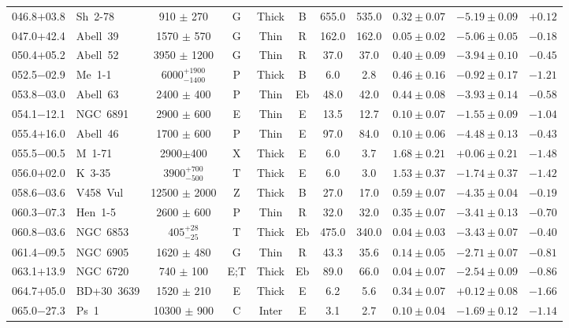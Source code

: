 \documentclass[useAMS]{mn2e}
\begin{document}
\begin{center}
{\begin{longtable}{llccccccccc}
046.8$+$03.8		&	Sh~2-78	&	910	$\pm$	270	&	G		&	Thick		&	B		&	655.0		&	535.0		&	$0.32 \pm 0.07$		&	$-5.19 \pm 0.09$		&	$+0.12$	\\
047.0$+$42.4		&	Abell~39	&	1570	$\pm$	570	&	G		&	Thin		&	R		&	162.0		&	162.0		&	$0.05 \pm 0.02$		&	$-5.06 \pm 0.05$		&	$-0.18$	\\
050.4$+$05.2		&	Abell~52	&	3950	$\pm$	1200	&	G		&	Thin		&	R		&	37.0		&	37.0		&	$0.40 \pm 0.09$		&	$-3.94 \pm 0.10$		&	$-0.45$	\\
052.5$-$02.9		&	Me~1-1	&	$6000^{+1900}_{-1400}$		&	P		&	Thick		&	B		&	6.0		&	2.8		&	$0.46 \pm 0.16$		&	$-0.92 \pm 0.17$		&	$-1.21$	\\
053.8$-$03.0		&	Abell~63	&	2400	$\pm$	400	&	P		&	Thin		&	Eb		&	48.0		&	42.0		&	$0.44 \pm 0.08$		&	$-3.93 \pm 0.14$		&	$-0.58$	\\
054.1$-$12.1		&	NGC~6891	&	2900	$\pm$	600	&	E		&	Thin		&	E		&	13.5		&	12.7		&	$0.10 \pm 0.07$		&	$-1.55 \pm 0.09$		&	$-1.04$	\\
055.4$+$16.0		&	Abell~46	&	1700	$\pm$	600	&	P		&	Thin		&	E		&	97.0		&	84.0		&	$0.10 \pm 0.06$		&	$-4.48 \pm 0.13$		&	$-0.43$	\\
055.5$-$00.5		&	M~1-71	&	2900$\pm$400		&	X		&	Thick		&	E		&	6.0		&	3.7		&	$1.68 \pm 0.21$		&	$+0.06 \pm 0.21$		&	$-1.48$	\\
056.0$+$02.0		&	K~3-35	&	$3900^{+700}_{-500}$		&	T		&	Thick		&	E		&	6.0		&	3.0		&	$1.53 \pm 0.37$		&	$-1.74 \pm 0.37$		&	$-1.42$	\\
058.6$-$03.6		&	V458~Vul	&	12500	$\pm$	2000	&	Z		&	Thick		&	B		&	27.0		&	17.0		&	$0.59 \pm 0.07$		&	$-4.35 \pm 0.04$		&	$-0.19$	\\
060.3$-$07.3		&	Hen~1-5	&	2600	$\pm$	600	&	P		&	Thin		&	R		&	32.0		&	32.0		&	$0.35 \pm 0.07$		&	$-3.41 \pm 0.13$		&	$-0.70$	\\
060.8$-$03.6		&	NGC~6853	&	$405^{+28}_{-25}$		&	T		&	Thick		&	Eb		&	475.0		&	340.0		&	$0.04 \pm 0.03$		&	$-3.43 \pm 0.07$		&	$-0.40$	\\
061.4$-$09.5		&	NGC~6905	&	1620	$\pm$	480	&	G		&	Thin		&	R		&	43.3		&	35.6		&	$0.14 \pm 0.05$		&	$-2.71 \pm 0.07$		&	$-0.81$	\\
063.1$+$13.9		&	NGC~6720	&	740	$\pm$	100	&	E;T		&	Thick		&	Eb		&	89.0		&	66.0		&	$0.04 \pm 0.07$		&	$-2.54 \pm 0.09$		&	$-0.86$	\\
064.7$+$05.0		&	BD+30~3639	&	1520	$\pm$	210	&	E		&	Thick		&	E		&	6.2		&	5.6		&	$0.34 \pm 0.07$		&	$+0.12 \pm 0.08$		&	$-1.66$	\\
065.0$-$27.3		&	Ps~1	&	10300	$\pm$	900	&	C		&	Inter		&	E		&	3.1		&	2.7		&	$0.10 \pm 0.04$		&	$-1.69 \pm 0.12$		&	$-1.14$	\\

\end{longtable}}
\end{center}
\end{document}
